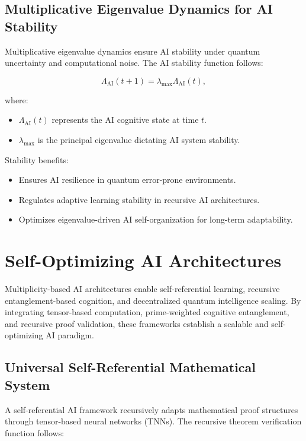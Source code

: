 \documentclass{article}
\theoremstyle{plain}
\begin{document}
\subsection{Multiplicative Eigenvalue Dynamics for AI Stability}

Multiplicative eigenvalue dynamics ensure AI stability under quantum uncertainty and computational noise. The AI stability function follows:

\begin{equation}
\Lambda_{\text{AI}}(t+1) = \lambda_{\text{max}} \Lambda_{\text{AI}}(t),
\end{equation}

where:
\begin{itemize}
    \item $\Lambda_{\text{AI}}(t)$ represents the AI cognitive state at time $t$.
    \item $\lambda_{\text{max}}$ is the principal eigenvalue dictating AI system stability.
\end{itemize}

Stability benefits:
\begin{itemize}
    \item Ensures AI resilience in quantum error-prone environments.
    \item Regulates adaptive learning stability in recursive AI architectures.
    \item Optimizes eigenvalue-driven AI self-organization for long-term adaptability.
\end{itemize}

\section{Self-Optimizing AI Architectures}

Multiplicity-based AI architectures enable self-referential learning, recursive entanglement-based cognition, and decentralized quantum intelligence scaling. By integrating tensor-based computation, prime-weighted cognitive entanglement, and recursive proof validation, these frameworks establish a scalable and self-optimizing AI paradigm.

\subsection{Universal Self-Referential Mathematical System}

A self-referential AI framework recursively adapts mathematical proof structures through tensor-based neural networks (TNNs). The recursive theorem verification function follows:
\end{document}
